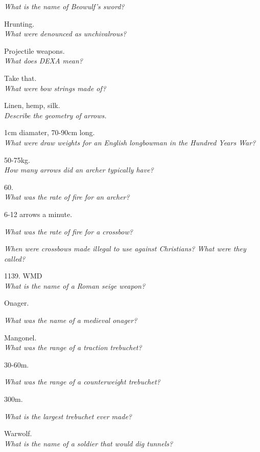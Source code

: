 \documentclass[12pt]{article}
\begin{document}
\textit{What is the name of Beowulf's sword?}

Hrunting.\\

\textit{What were denounced as unchivalrous?}

Projectile weapons.\\

\textit{What does DEXA mean?}

Take that.\\

\textit{What were bow strings made of?}

Linen, hemp, silk.\\

\textit{Describe the geometry of arrows.}

1cm diamater, 70-90cm long.\\

\textit{What were draw weights for an English longbowman in the Hundred Years War?}

50-75kg.\\

\textit{How many arrows did an archer typically have?}

60.\\

\textit{What was the rate of fire for an archer?}

6-12 arrows a minute.

\textit{What was the rate of fire for a crossbow?}

\textit{When were crossbows made illegal to use against Christians? What were they called?}

1139. WMD\\

\textit{What is the name of a Roman seige weapon?}

Onager.

\textit{What was the name of a medieval onager?}

Mangonel.\\

\textit{What was the range of a traction trebuchet?}

30-60m.

\textit{What was the range of a counterweight trebuchet?}

300m.

\textit{What is the largest trebuchet ever made?}

Warwolf.\\

\textit{What is the name of a soldier that would dig tunnels?}
\end{document}
